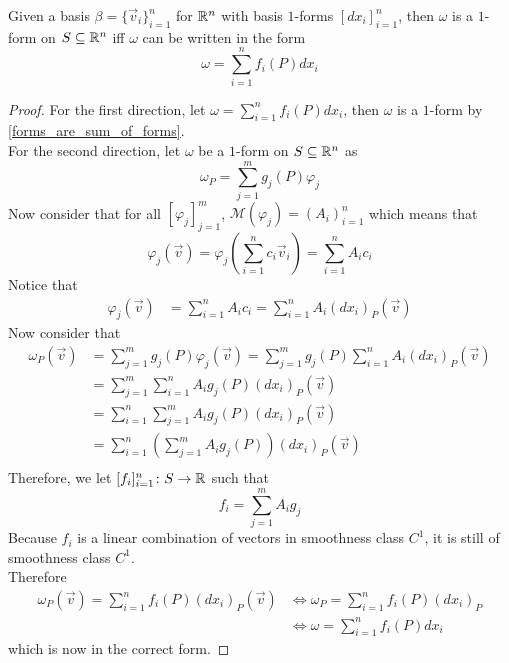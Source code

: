\documentclass[notes]{subfiles}
\begin{document}
\begin{theorem}
    Given a basis $\beta = \{ \vec{v}_i \}_{i = 1}^n$ for $\mathbb{R}^n$ with basis $1$-forms $[dx_i]_{i = 1}^n$, then $\omega$ is a $1$-form on $S \subseteq \mathbb{R}^n$ iff $\omega$ can be written in the form
    \[
        \omega = \sum_{i = 1}^n f_i(P)dx_i
    \]
\end{theorem}
\begin{proof}
    For the first direction, let $\omega = \sum_{i = 1}^n f_i(P)dx_i$, then $\omega$ is a $1$-form by \cref{forms_are_sum_of_forms}. \\
    For the second direction, let $\omega$ be a $1$-form on $S \subseteq \mathbb{R}^n$ as
    \[
        \omega_P = \sum_{j = 1}^m g_j(P)\varphi_j
    \]
    Now consider that for all $[\varphi_j]_{j = 1}^m$, $\mathcal{M}(\varphi_j) = (A_i)_{i = 1}^n$ which means that
    \[
        \varphi_j(\vec{v}) = \varphi_j\left( \sum_{i = 1}^n c_i\vec{v}_i \right) = \sum_{i = 1}^n A_ic_i
    \]
    Notice that
    \begin{align*}
        \varphi_j(\vec{v})
        &= \sum_{i = 1}^n A_ic_i
        = \sum_{i = 1}^n A_i(dx_i)_P(\vec{v})
    \end{align*}
    Now consider that
    \begin{align*}
        \omega_P(\vec{v})
        &= \sum_{j = 1}^m g_j(P)\varphi_j(\vec{v})
        = \sum_{j = 1}^m g_j(P)\sum_{i = 1}^n A_i(dx_i)_P(\vec{v}) \\
        &= \sum_{j = 1}^m \sum_{i = 1}^n A_i g_j(P) (dx_i)_P(\vec{v}) \\
        &= \sum_{i = 1}^n \sum_{j = 1}^m A_i g_j(P) (dx_i)_P(\vec{v}) \\
        &= \sum_{i = 1}^n \left( \sum_{j = 1}^m A_i g_j(P) \right) (dx_i)_P(\vec{v}) \\
    \end{align*}
    Therefore, we let $[f_i]_{i = 1}^n\colon S \to \mathbb{R}$ such that
    \[
        f_i = \sum_{j = 1}^m A_i g_j
    \]
    Because $f_i$ is a linear combination of vectors in smoothness class $C^1$, it is still of smoothness class $C^1$. \\
    Therefore
    \begin{align*}
        \omega_P(\vec{v}) = \sum_{i = 1}^n f_i(P) (dx_i)_P(\vec{v})
        &\iff \omega_P = \sum_{i = 1}^n f_i(P) (dx_i)_P \\
        &\iff \omega = \sum_{i = 1}^n f_i(P) dx_i
    \end{align*}
    which is now in the correct form.
\end{proof}
\end{document}

